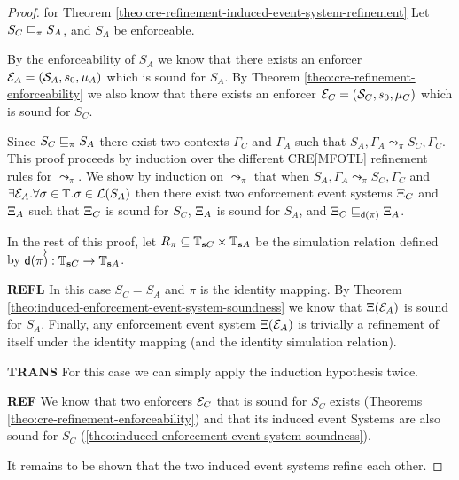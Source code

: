 \begin{proof}
    for Theorem \ref{theo:cre-refinement-induced-event-system-refinement}
    Let $S_C \sqsubseteq_\pi S_A$,
    and $S_A$ be enforceable.

    By the enforceability of $S_A$ we know that
    there exists an enforcer
    $\mathcal{E}_A = (\mathcal{S}_A, s_0, \mu_A)$
    which is sound for $S_A$.
    By Theorem \ref{theo:cre-refinement-enforceability}
    we also know that there exists an enforcer
    $\mathcal{E}_C = (\mathcal{S}_C, s_0, \mu_C)$
    which is sound for $S_C$.

    Since $S_C \sqsubseteq_\pi S_A$ there exist two
    contexts $\Gamma_C$ and $\Gamma_A$
    such that $S_A, \Gamma_A \leadsto_\pi S_C, \Gamma_C$.
    This proof proceeds by induction over the different
    CRE[MFOTL] refinement rules for $\leadsto_\pi$.
    We show by induction on $\leadsto_\pi$ that when
    $S_A, \Gamma_A \leadsto_\pi S_C, \Gamma_C$ and
    $\exists \mathcal{E}_A. \forall \sigma \in \mathbb{T}. \sigma \in \mathcal{L}(S_A)$
    then there exist two enforcement event systems
    $\Xi_C$ and $\Xi_A$ such that
    $\Xi_C$ is sound for $S_C$,
    $\Xi_A$ is sound for $S_A$, and
    $\Xi_C \sqsubseteq_{\mathsf{d}(\pi)} \Xi_A$.

    In the rest of this proof, let
    $R_\pi \subseteq \mathbb{T}_{\mathbf{s} C} \times \mathbb{T}_{\mathbf{s} A}$
    be the simulation relation
    defined by
    $\overrightarrow{\mathsf{d}(\pi)}: \mathbb{T}_{\mathbf{s} C} \to \mathbb{T}_{\mathbf{s} A}$.

    \textbf{REFL} In this case $S_C = S_A$ and $\pi$ is the 
    identity mapping.
    By Theorem
    \ref{theo:induced-enforcement-event-system-soundness}
    we know that $\Xi(\mathcal{E}_A)$ is sound for
    $S_A$.
    Finally, any enforcement event system 
    $\Xi(\mathcal{E}_A)$ is trivially a refinement
    of itself under the identity mapping
    (and the identity simulation relation).
    
    \textbf{TRANS} For this case we can simply apply the
    induction hypothesis twice.

    \textbf{REF}
    We know that two enforcers $\mathcal{E}_C$ that is
    sound for $S_C$ exists
    (Theorems \ref{theo:cre-refinement-enforceability})
    and that its induced event Systems
    are also sound for $S_C$
    (\ref{theo:induced-enforcement-event-system-soundness}).

    It remains to be shown that the two induced
    event systems refine each other.


\end{proof}
